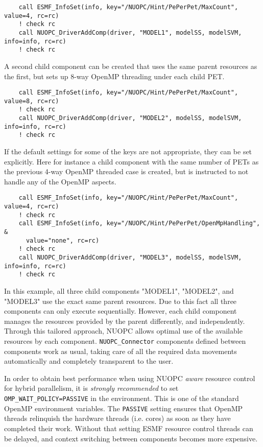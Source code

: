 \begin{verbatim}
    call ESMF_InfoSet(info, key="/NUOPC/Hint/PePerPet/MaxCount", value=4, rc=rc)
    ! check rc
    call NUOPC_DriverAddComp(driver, "MODEL1", modelSS, modelSVM, info=info, rc=rc)
    ! check rc
\end{verbatim}

A second child component can be created that uses the same parent resources as the first, but sets up 8-way OpenMP threading under each child PET.

\begin{verbatim}
    call ESMF_InfoSet(info, key="/NUOPC/Hint/PePerPet/MaxCount", value=8, rc=rc)
    ! check rc
    call NUOPC_DriverAddComp(driver, "MODEL2", modelSS, modelSVM, info=info, rc=rc)
    ! check rc
\end{verbatim}

If the default settings for some of the keys are not appropriate, they can be set explicitly. Here for instance a child component with the same number of PETs as the previous 4-way OpenMP threaded case is created, but is instructed to not handle any of the OpenMP aspects.

\begin{verbatim}
    call ESMF_InfoSet(info, key="/NUOPC/Hint/PePerPet/MaxCount", value=4, rc=rc)
    ! check rc
    call ESMF_InfoSet(info, key="/NUOPC/Hint/PePerPet/OpenMpHandling", &
      value="none", rc=rc)
    ! check rc
    call NUOPC_DriverAddComp(driver, "MODEL3", modelSS, modelSVM, info=info, rc=rc)
    ! check rc
\end{verbatim}

In this example, all three child components "MODEL1", "MODEL2", and "MODEL3" use the exact same parent resources. Due to this fact all three components can only execute sequentially. However, each child component manages the resources provided by the parent differently, and independently. Through this tailored approach, NUOPC allows optimal use of the available resources by each component. {\tt NUOPC\_Connector} components defined between components work as usual, taking care of all the required data movements automatically and completely transparent to the user.

In order to obtain best performance when using NUOPC {\em aware} resource control for hybrid parallelism, it is {\em strongly recommended} to set {\tt OMP\_WAIT\_POLICY=PASSIVE} in the environment. This is one of the standard OpenMP environment variables. The {\tt PASSIVE} setting ensures that OpenMP threads relinquish the hardware threads (i.e. cores) as soon as they have completed their work. Without that setting ESMF resource control threads can be delayed, and context switching between components becomes more expensive.
